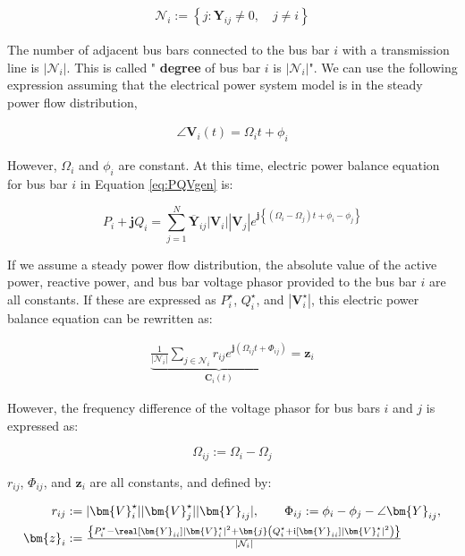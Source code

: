\documentclass[graybox, envcountchap]{svmult}
\begin{document}
\begin{align*}
\mathcal{N}_i:=
\left\{
j : \bm{Y}_{ij} \neq 0,\quad j \neq i
\right\}
\end{align*}

The number of adjacent bus bars connected to the bus bar $i$ with a transmission line is $|\mathcal{N}_i|$.
This is called "\textbf{ degree} of bus bar $i$ is $|\mathcal{N}_i|$".
We can use the following expression assuming that the electrical power system model is in the steady power flow distribution, 

\begin{align*}
\angle \bm{V}_i (t) = \Omega_i t +\phi_i
\end{align*}

However, $\Omega_i$ and $\phi_i$ are constant. 
At this time, electric power balance equation for bus bar $i$ in Equation \ref{eq:PQVgen} is:

\[
P_i + \bm{j} Q_i = \sum_{j=1}^N \overline{\bm{Y}}_{ij} |\bm{V}_i| |\bm{V}_j|
e^{\bm{j} \left\{ ( \Omega_i - \Omega_j )t + \phi_i -\phi_j \right\}}
\]

If we assume a steady power flow distribution, the absolute value of the active power, reactive power, and bus bar voltage phasor provided to the bus bar $i$ are all constants.
If these are expressed as $P_i^{\star}$, $Q_i^{\star}$, and $|\bm{V}_i^{\star}|$, this electric power balance equation can be rewritten as:

\begin{align}\label{eq:sumcirc}
\underbrace{
\frac{1}{|\mathcal{N}_i|}\sum_{j \in \mathcal{N}_i } 
r_{ij}
e^{\bm{j} 
\left(
\Omega_{ij}t + 
\Phi_{ij}
\right) }
}_{\bm{C}_i (t)}
= \bm{z}_i
\end{align}

However, the frequency difference of the voltage phasor for bus bars $i$ and $j$ is expressed as:

\[
\Omega_{ij}:=\Omega_{i}-\Omega_{j}
\]

$r_{ij}$, $\Phi_{ij}$, and $\bm{z}_i$ are all constants, and defined by:

\begin{align*}
r_{ij} &:=|\bm{V}_i^{\star}| |\bm{V}_j^{\star}| |\bm{Y}_{ij}|, \qquad
\Phi_{ij} := \phi_i - \phi_j - \angle \bm{Y}_{ij},
\\
\bm{z}_i &:=  \tfrac{
\left\{
P_i^{\star} - \real[\bm{Y}_{ii}] |\bm{V}_i^{\star}|^2
+ \bm{j}
\left(
Q_i^{\star} + \imag [\bm{Y}_{ii}] |\bm{V}_i^{\star}|^2
\right)
\right\}
}
{|\mathcal{N}_i|}
\end{align*}
\end{document}
